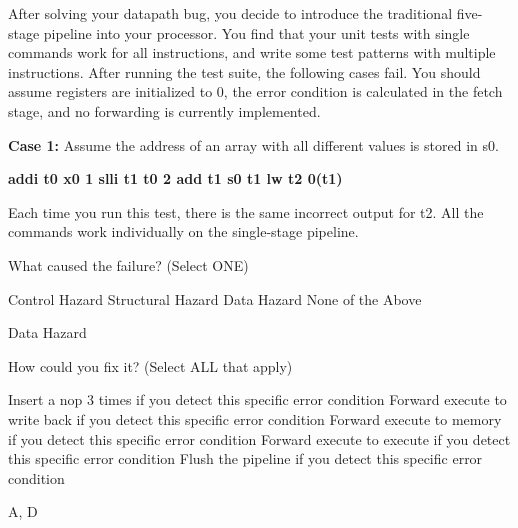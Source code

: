 \begin{blocksection}
After solving your datapath bug, you decide to introduce the traditional five-stage pipeline into your processor.
You find that your unit tests with single commands work for all instructions, and write some test patterns with
multiple instructions. After running the test suite, the following cases fail. You should assume registers are
initialized to 0, the error condition is calculated in the fetch stage, and no forwarding is currently implemented.

\textbf{Case 1:} Assume the address of an array with all different values is stored in s0.


\textbf{addi t0 x0 1
\newline
\hspace{10mm} slli t1 t0 2
\newline
\hspace{10mm} add t1 s0 t1
\newline
\hspace{10mm} lw t2 0(t1)
\newline
}

\newline
Each time you run this test, there is the same incorrect output for t2. All the commands work individually on
the single-stage pipeline.

\question 
What caused the failure? (Select ONE)
\begin{checkboxes}
 \choice Control Hazard
 \choice Structural Hazard
 \choice Data Hazard
 \choice None of the Above
\end{checkboxes}

\begin{solution}[0.5in]
Data Hazard
\end{solution}

\question
How could you fix it? (Select ALL that apply)
\begin{checkboxes}
 \choice Insert a nop 3 times if you detect this specific error condition
 \choice Forward execute to write back if you detect this specific error condition
 \choice Forward execute to memory if you detect this specific error condition
 \choice Forward execute to execute if you detect this specific error condition
 \choice Flush the pipeline if you detect this specific error condition
\end{checkboxes}

\begin{solution}[0.5in]
A, D
\end{solution}

\end{blocksection}

